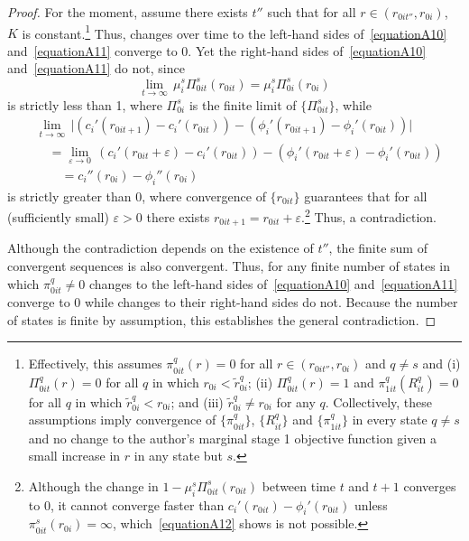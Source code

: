 \begin{proof}
For the moment, assume there exists $t''$ such that for all $r\in(r_{0it''},r_{0i})$, $K$ is constant.\footnote{Effectively, this assumes $\pi_{0it}^q(r)=0$ for all $r\in(r_{0it''},r_{0i})$ and $q\ne s$ and (i) $\Pi_{0it}^q(r)=0$ for all $q$ in which $r_{0i}<\widetilde r_{0i}^q$; (ii) $\Pi_{0it}^q(r)=1$ and $\pi_{1it}^q(R_{it}^q)=0$ for all $q$ in which $\widetilde r_{0i}^q<r_{0i}$; and (iii) $\widetilde r_{0i}^q\ne r_{0i}$ for any $q$. Collectively, these assumptions imply convergence of $\{\pi_{0it}^q\}$, $\{R_{it}^q\}$ and $\{\pi_{1it}^q\}$ in every state $q\ne s$ and no change to the author's marginal stage 1 objective function given a small increase in $r$ in any state but $s$. } Thus, changes over time to the left-hand sides of~\autoref{equationA10} and~\autoref{equationA11} converge to 0. Yet the right-hand sides of~\autoref{equationA10} and~\autoref{equationA11} do not, since
\begin{equation*}
	\lim_{t\rightarrow\infty}\,\mu_i^s\Pi_{0it}^s(r_{0it})=\mu_i^s\Pi_{0i}^s(r_{0i})
\end{equation*}
is strictly less than 1, where $\Pi_{0i}^s$ is the finite limit of $\{\Pi_{0it}^s\}$, while
\begin{align*}
	&\lim_{t\rightarrow\infty}\,\Big|\left(c_i'(r_{0it+1})-c_i'(r_{0it})\right)-\left(\phi_i'(r_{0it+1})-\phi_i'(r_{0it})\right)\Big|\\
	&\quad=\lim_{\varepsilon\rightarrow0}\,\left(c_i'(r_{0it}+\varepsilon)-c_i'(r_{0it})\right)-\left(\phi_i'(r_{0it}+\varepsilon)-\phi_i'(r_{0it})\right)\\
	&\qquad=c_i''(r_{0i})-\phi_i''(r_{0i})
\end{align*}
is strictly greater than 0, where convergence of $\{r_{0it}\}$ guarantees that for all (sufficiently small) $\varepsilon>0$ there exists $r_{0it+1}=r_{0it}+\varepsilon$.\footnote{Although the change in $1-\mu_i^s\Pi_{0it}^s(r_{0it})$ between time $t$ and $t+1$ converges to 0, it cannot converge faster than $c_i'(r_{0it})-\phi_i'(r_{0it})$ unless $\pi_{0it}^s(r_{0i})=\infty$, which~\autoref{equationA12} shows is not possible.} Thus, a contradiction.
	
Although the contradiction depends on the existence of $t''$, the finite sum of convergent sequences is also convergent. Thus, for any finite number of states in which $\pi_{0it}^q\ne0$ changes to the left-hand sides of~\autoref{equationA10} and~\autoref{equationA11} converge to 0 while changes to their right-hand sides do not. Because the number of states is finite by assumption, this establishes the general contradiction.
\end{proof}

